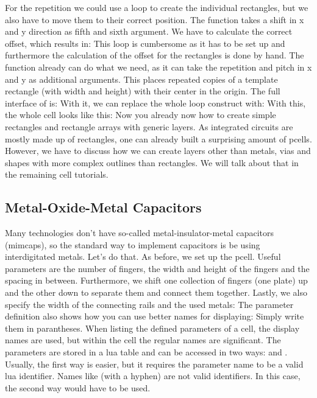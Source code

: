 For the repetition we could use a loop to create the individual rectangles, but we also have to move them to their correct position.
The  function takes a shift in x and y direction as fifth and sixth argument.
We have to calculate the correct offset, which results in:
This loop is cumbersome as it has to be set up and furthermore the calculation of the offset for the rectangles is done by hand.
The function  already can do what we need, as it can take the repetition and pitch in x and y as additional arguments.
This places repeated copies of a template rectangle (with width and height) with their center in the origin.
The full interface of  is:
With it, we can replace the whole loop construct with:
With this, the whole cell looks like this:
Now you already now how to create simple rectangles and rectangle arrays with generic layers.
As integrated circuits are mostly made up of rectangles, one can already built a surprising amount of pcells.
However, we have to discuss how we can create layers other than metals, vias and shapes with more complex outlines than rectangles.
We will talk about that in the remaining cell tutorials.

\subsection{Metal-Oxide-Metal Capacitors}
Many technologies don't have so-called metal-insulator-metal capacitors (mimcaps), so the standard way to implement capacitors is be using interdigitated metals.
Let's do that. As before, we set up the pcell. Useful parameters are the number of fingers, the width and height of the fingers and the spacing in between.
Furthermore, we shift one collection of fingers (one plate) up and the other down to separate them and connect them together.
Lastly, we also specify the width of the connecting rails and the used metals:
The parameter definition also shows how you can use better names for displaying: Simply write them in parantheses.
When listing the defined parameters of a cell, the display names are used, but within the cell the regular names are significant.
The parameters are stored in a lua table and can be accessed in two ways:
 and .
Usually, the first way is easier, but it requires the parameter name to be a valid lua identifier.
Names like  (with a hyphen) are not valid identifiers.
In this case, the second way would have to be used.

